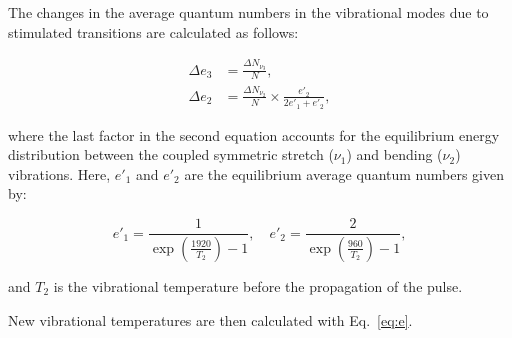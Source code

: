 \documentclass{report}
\begin{document}
The changes in the average quantum numbers in the vibrational modes due to stimulated transitions are calculated as follows:

\begin{equation}\label{eq:Deltae}
\begin{aligned}
\Delta e_3 &= \frac{\Delta N_{\nu_3}}{N}, \\
\Delta e_2 &= \frac{\Delta N_{\nu_2}}{N} \times \frac{e'_2}{2 e'_1 + e'_2},
\end{aligned}
\end{equation}

where the last factor in the second equation accounts for the equilibrium energy distribution between the coupled symmetric stretch ($\nu_1$) and bending ($\nu_2$) vibrations. Here, $e'_1$ and $e'_2$ are the equilibrium average quantum numbers given by:

\[
e'_1 = \frac{1}{\exp\left( \frac{1920}{T_2} \right) - 1}, \quad e'_2 = \frac{2}{\exp\left( \frac{960}{T_2} \right) - 1},
\]

and $T_2$ is the vibrational temperature before the propagation of the pulse.





New vibrational temperatures are then calculated with Eq.~\ref{eq:e}.
\end{document}
